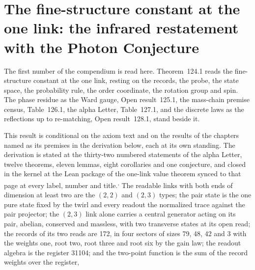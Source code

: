 \section{The fine-structure constant at the one link: the infrared restatement with the Photon Conjecture}\label{mod:V-1-fine-structure-constant-at-the-one-link}
\par\noindent{}\par\medskip
\label{narr:open:5-1}The first number of the compendium is read here. Theorem~124.1 reads the fine-structure constant at the one link, resting on the records, the probe, the state space, the probability rule, the order coordinate, the rotation group and spin. The phase residue as the Ward gauge, Open result~125.1, the mass-chain premise census, Table~126.1, the alpha Letter, Table~127.1, and the discrete laws as the reflections up to re-matching, Open result~128.1, stand beside it.
\begin{chconditional}\label{box:V-1-fine-structure-constant-at-the-one-link:1}
This result is conditional on the axiom text and on the results of the chapters named as its premises in the derivation below, each at its own standing.
The derivation is stated at the thirty-two numbered statements of the alpha Letter, twelve theorems, eleven lemmas, eight corollaries and one conjecture, and closed in the kernel at the Lean package of the one-link value theorem synced to that page at every label, number and title.\textsuperscript{,} The readable links with both ends of dimension at least two are the $(2,2)$ and $(2,3)$ types; the pair state is the one pure state fixed by the twirl and every readout the normalized trace against the pair projector; the $(2,3)$ link alone carries a central generator acting on its pair, abelian, conserved and massless, with two transverse states at its open read; the records of its two reads are 172, in four sectors of sizes 79, 48, 42 and 3 with the weights one, root two, root three and root six by the gain law; the readout algebra is the register 31104; and the two-point function is the sum of the record weights over the register,
\end{chconditional}
